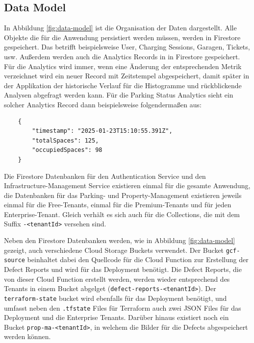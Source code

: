 \subsection{Data Model}

In Abbildung \ref{fig:data-model} ist die Organisation der Daten dargestellt. Alle Objekte die für die Anwendung persistiert werden müssen, werden in Firestore gespeichert. Das betrifft beispielsweise User, Charging Sessions, Garagen, Tickets, usw. Außerdem werden auch die Analytics Records in in Firestore gespeichert. Für die Analytics wird immer, wenn eine Änderung der entsprechenden Metrik verzeichnet wird ein neuer Record mit Zeitstempel abgespeichert, damit später in der Applikation der historische Verlauf für die Histogramme und rückblickende Analysen abgefragt werden kann. Für die Parking Status Analytics sieht ein solcher Analytics Record dann beispielsweise folgendermaßen aus:

\begin{verbatim}
    {
        "timestamp": "2025-01-23T15:10:55.391Z",
        "totalSpaces": 125,
        "occupiedSpaces": 98
    }
\end{verbatim}

Die Firestore Datenbanken für den Authentication Service und den Infrastructure-Management Service existieren einmal für die gesamte Anwendung, die Datenbanken für das Parking- und Property-Management existieren jeweils einmal für die Free-Tenants, einmal für die Premium-Tenants und für jeden Enterprise-Tenant. Gleich verhält es sich auch für die Collections, die mit dem Suffix \verb|-<tenantId>| versehen sind.

Neben den Firestore Datenbanken werden, wie in Abbildung \ref{fig:data-model} gezeigt, auch verschiedene Cloud Storage Buckets verwendet. Der Bucket \verb|gcf-source| beinhaltet dabei den Quellcode für die Cloud Function zur Erstellung der Defect Reports und wird für das Deployment benötigt. Die Defect Reports, die von dieser Cloud Function erstellt werden, werden wieder entsprechend des Tenants in einem Bucket abgelget (\verb|defect-reports-<tenantId>|). Der \verb|terraform-state| bucket wird ebenfalls für das Deployment benötigt, und umfasst neben den \verb|.tfstate| Files für Terraform auch zwei JSON Files für das Deployment und die Enterprise Tenants.
Darüber hinaus existiert noch ein Bucket \verb|prop-ma-<tenantId>|, in welchem die Bilder für die Defects abgespeichert werden können.

